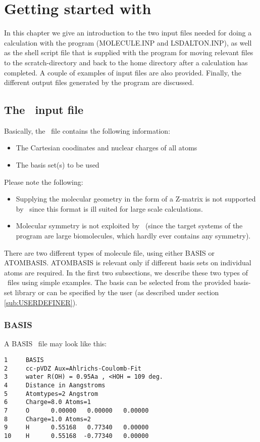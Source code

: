 \chapter{Getting started with {\lsdalton}}\label{ch:starting}

In this chapter we give an introduction to the two input files needed
for doing a calculation with the {\lsdalton} program
(MOLECULE.INP and LSDALTON.INP), as well as the
shell script file that is supplied with the program for moving
relevant files to the scratch-directory and back to the home directory
after a calculation has completed. A couple of examples of
input files  are also provided. Finally, the different output files
generated by the program are discussed.

\section{The \mol\ input file}

Basically, the \mol\ file contains the following information:
\begin{itemize}
\item The Cartesian coodinates and nuclear charges of all atoms
\item The basis set(s) to be used
\end{itemize}

Please note the following:
\begin{itemize}
\item Supplying the molecular geometry in the form of a Z-matrix 
is not supported
by \lsdalton\, since this format is ill suited for large scale 
calculations.
\item Molecular symmetry is not exploited by \lsdalton\, (since
the target systems of the program are large biomolecules, which
hardly ever contains any symmetry). 
\end{itemize}

There are two different types of molecule file, using either BASIS or ATOMBASIS.
ATOMBASIS is relevant only if different basis sets on individual atoms are required.
In the first two subsections, we describe these two types of \mol\ files using simple examples.
The basis can be selected from the provided basis-set library or can be specified by 
the user (as described under section \ref{sub:USERDEFINER}).

\subsection{BASIS}
A BASIS \mol\ file may look like this:
\begin{verbatim}
1     BASIS
2     cc-pVDZ Aux=Ahlrichs-Coulomb-Fit
3     water R(OH) = 0.95Aa , <HOH = 109 deg.
4     Distance in Aangstroms
5     Atomtypes=2 Angstrom
6     Charge=8.0 Atoms=1
7     O      0.00000   0.00000   0.00000
8     Charge=1.0 Atoms=2
9     H      0.55168   0.77340   0.00000
10    H      0.55168  -0.77340   0.00000
\end{verbatim} 

